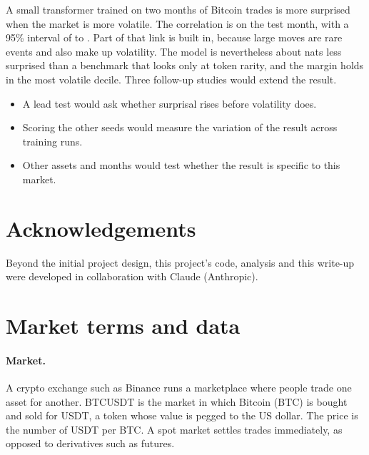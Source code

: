\documentclass[11pt]{article}
\begin{document}
A small transformer trained on two months of Bitcoin trades is more surprised when the market is more volatile.
The correlation is \Corr{} on the test month, with a 95\% interval of \CorrLo{} to \CorrHi{}.
Part of that link is built in, because large moves are rare events and also make up volatility.
The model is nevertheless about \GapAvg{} nats less surprised than a benchmark that looks only at token rarity, and the margin holds in the most volatile decile.
Three follow-up studies would extend the result.
\begin{itemize}
  \item A lead test would ask whether surprisal rises before volatility does.
  \item Scoring the other seeds would measure the variation of the result across training runs.
  \item Other assets and months would test whether the result is specific to this market.
\end{itemize}

\section*{Acknowledgements}
Beyond the initial project design, this project's code, analysis and this write-up were developed in collaboration with Claude (Anthropic).




\appendix

\section{Market terms and data}\label{app:data}

\paragraph{Market.}
A crypto exchange such as Binance runs a marketplace where people trade one asset for another.
BTCUSDT is the market in which Bitcoin (BTC) is bought and sold for USDT, a token whose value is pegged to the US dollar.
The price is the number of USDT per BTC.
A spot market settles trades immediately, as opposed to derivatives such as futures.
\end{document}
